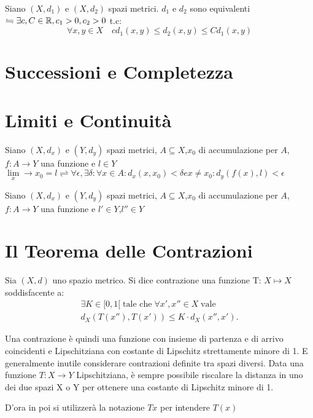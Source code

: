 Siano $(X,d_1)$ e $(X,d_2)$ spazi metrici. $d_1$ e $d_2$ sono equivalenti $\leftrightharpoons \exists c,C\in\mathbb{R}, c_1>0, c_2>0$ t.c:
$$ \forall x,y \in X\quad cd_1(x,y)\le d_2(x,y)\le Cd_1(x,y) $$


\section{Successioni e Completezza}

\section{Limiti e Continuità}
Siano $(X,d_x)$ e $(Y,d_y)$ spazi metrici, $A\subseteq{X}$,$x_0$ di accumulazione per $A$, $f:A\rightarrow{Y}$ una funzione e $l\in{Y}$ \\
$\lim\limits_x\rightarrow{x_0} = l \rightleftharpoons \forall{\epsilon},\exists\delta : \forall{x}\in A : d_x(x,x_0)<\delta e x\ne{x_0} : d_y(f(x),l)<\epsilon$

\proposition
Siano $(X,d_x)$ e $(Y,d_y)$ spazi metrici, $A\subseteq{X}$,$x_0$ di accumulazione per $A$, $f:A\rightarrow{Y}$ una funzione e $l'\in{Y}$,$l''\in{Y}$  \\

\section{Il Teorema delle Contrazioni}
\begin{definition}[Contrazione]
	\label{def:contrazione}
	Sia $(X, d)$ uno spazio metrico. Si dice contrazione una funzione T: $X \mapsto X$ soddisfacente a:
	\begin{align}
		\label{equaz:def_contrazione}
		\exists K \in [0, 1[\;\text{tale che}\;\forall x',x''\in X\;\text{vale}\\
		d_X(T(x''), T(x')) \le K \cdot d_X(x'', x').
	\end{align}


	Una contrazione è quindi una funzione con insieme di partenza e di arrivo coincidenti e
	Lipschitziana con costante di Lipschitz strettamente minore di 1.
	E generalmente inutile considerare contrazioni definite tra spazi diversi. Data una funzione
	$T: X\rightarrow Y$ Lipschitziana, è sempre possibile riscalare la distanza in uno dei due spazi X o Y
	per ottenere una costante di Lipschitz minore di 1.
	\begin{note}
		D'ora in poi si utilizzerà la notazione $Tx$ per intendere $T(x)$
	\end{note}
\end{definition}

